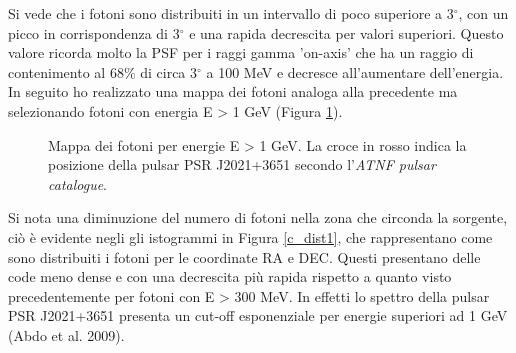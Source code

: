 \documentclass[a4paper,twocolumn]{article}
\begin{document}
\begin{large}
\noindent
Si vede che i fotoni sono distribuiti in un intervallo di poco superiore a 3$^{\circ}$, con un picco in corrispondenza di 3$^{\circ}$ e una rapida decrescita per valori superiori. Questo valore ricorda molto la PSF per i raggi gamma 'on-axis' che ha un raggio di contenimento al 68$\%$ di circa 3$^{\circ}$ a 100 MeV e decresce all'aumentare dell'energia.\\
In seguito ho realizzato una mappa dei fotoni analoga alla precedente ma selezionando fotoni con energia E > 1 GeV (Figura \ref{cmap1G}).

\begin{figure}[h]
    \caption{\small Mappa dei fotoni per energie E > 1 GeV. La croce in rosso indica la posizione della pulsar PSR J2021+3651 secondo l'\textit{ATNF pulsar catalogue}.}
    \label{cmap1G}
\end{figure}

\noindent
Si nota una diminuzione del numero di fotoni nella zona che circonda la sorgente, ciò è evidente negli gli istogrammi in Figura \ref{c_dist1}, che rappresentano come sono distribuiti i fotoni per le coordinate RA e DEC.
Questi presentano delle code meno dense e con una decrescita più rapida rispetto a quanto visto precedentemente per fotoni con E > 300 MeV.
In effetti lo spettro della pulsar PSR J2021+3651 presenta un cut-off esponenziale per energie superiori ad 1 GeV (Abdo et al. 2009).



\end{large}
\end{document}
